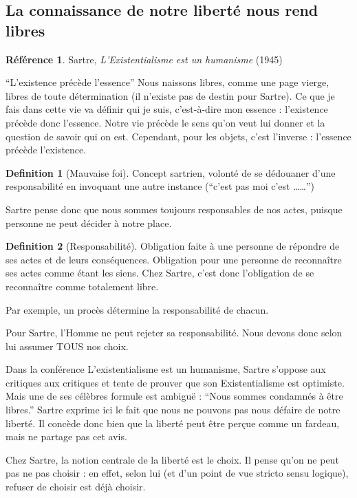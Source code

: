 \documentclass[french]{book}
\theoremstyle{definition}
\newtheorem*{dfn}{Definition}
\newtheorem*{refe}{Référence}
\begin{document}
\subsection{La connaissance de notre liberté nous rend libres}

\begin{refe}
	Sartre, \textit{L’Existentialisme est un humanisme }(1945)
\end{refe}

“L’existence précède l’essence”
Nous naissons libres, comme une page vierge, libres de toute détermination (il n’existe pas de destin pour Sartre). Ce que je fais dans cette vie va définir qui je suis, c’est-à-dire mon essence : l’existence précède donc l’essence. Notre vie précède le sens qu’on veut lui donner et la question de savoir qui on est.
Cependant, pour les objets, c’est l'inverse : l’essence précède l’existence.

\begin{dfn}[Mauvaise foi]
	Concept sartrien, volonté de se dédouaner d’une responsabilité en invoquant une autre instance (“c’est pas moi c’est ……”)
\end{dfn}

Sartre pense donc que nous sommes toujours responsables de nos actes, puisque personne ne peut décider à notre place.

\begin{dfn}[Responsabilité]
Obligation faite à une personne de répondre de ses actes et de leurs conséquences. Obligation pour une personne de reconnaître ses actes comme étant les siens. Chez Sartre, c’est donc l'obligation de se reconnaître comme totalement libre.
\end{dfn}

Par exemple, un procès détermine la responsabilité de chacun.

Pour Sartre, l’Homme ne peut rejeter sa responsabilité. Nous devons donc selon lui assumer TOUS nos choix.

Dans la conférence L’existentialisme est un humanisme, Sartre s’oppose aux critiques aux critiques et tente de prouver que son Existentialisme est optimiste. Mais une de ses célèbres formule est ambiguë :
“Nous sommes condamnés à être libres.”
Sartre exprime ici le fait que nous ne pouvons pas nous défaire de notre liberté. Il concède donc bien que la liberté peut être perçue comme un fardeau, mais ne partage pas cet avis.

Chez Sartre, la notion centrale de la liberté est le choix. Il pense qu’on ne peut pas ne pas choisir : en effet, selon lui (et d’un point de vue stricto sensu logique), refuser de choisir est déjà choisir.
\end{document}
